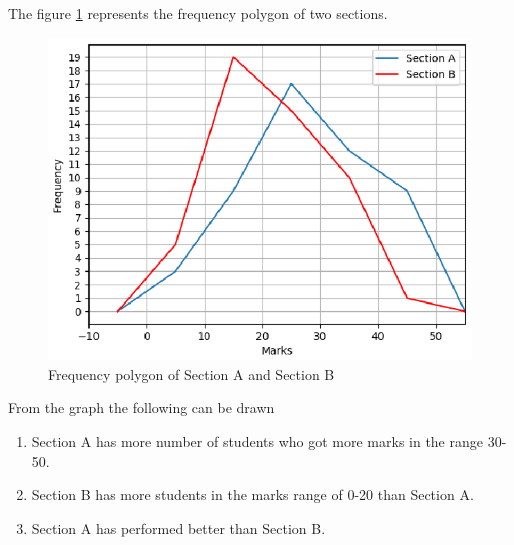  The figure \ref{fig:42_freqpoly1} represents the frequency polygon of two sections.
\begin{figure}[!ht]
\centering
\includegraphics[width= \columnwidth]{./solutions/40-50/statistics/figs/Q42.eps}
\caption{Frequency polygon of Section A and Section B}
\label{fig:42_freqpoly1}
\end{figure}
From the graph the following can be drawn
\begin{enumerate}
\item Section A has more number of students who got more marks in the range 30-50.
\item Section B has more students in the marks range of 0-20 than Section A.
\item Section A has performed better than Section B.
\end{enumerate}
